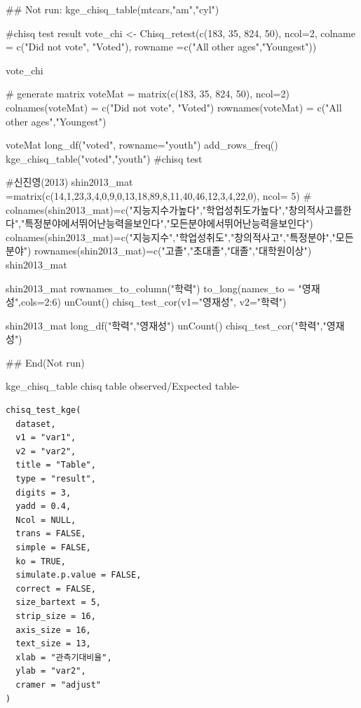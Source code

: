 \documentclass[a4paper]{book}
\begin{document}
\begin{Examples}
\begin{ExampleCode}

## Not run: 
kge_chisq_table(mtcars,"am","cyl")


#chisq test result
vote_chi <- Chisq_retest(c(183, 35, 824, 50), ncol=2,
                        colname = c("Did not vote", "Voted"),
                         rowname =c("All other ages","Youngest"))

vote_chi


# generate matrix
voteMat = matrix(c(183, 35, 824, 50), ncol=2)
colnames(voteMat) = c("Did not vote", "Voted")
rownames(voteMat) = c("All other ages","Youngest")

voteMat%
  long_df("voted", rowname="youth")%
  add_rows_freq() %
  kge_chisq_table("voted","youth")    #chisq test


#신진영(2013)
shin2013_mat =matrix(c(14,1,23,3,4,0,9,0,13,18,89,8,11,40,46,12,3,4,22,0), ncol= 5)
# colnames(shin2013_mat)=c("지능지수가높다","학업성취도가높다","창의적사고를한다","특정분야에서뛰어난능력을보인다","모든분야에서뛰어난능력을보인다")
colnames(shin2013_mat)=c("지능지수","학업성취도","창의적사고","특정분야","모든분야")
rownames(shin2013_mat)=c("고졸","초대졸","대졸","대학원이상")
shin2013_mat

shin2013_mat %
  rownames_to_column("학력") %
  to_long(names_to = "영재성",cols=2:6) %
  unCount() %
  chisq_test_cor(v1="영재성", v2="학력")


shin2013_mat%
  long_df("학력","영재성") %
  unCount() %
  chisq_test_cor("학력","영재성")


## End(Not run)
\end{ExampleCode}
\end{Examples}
%
\begin{Description}
kge\_chisq\_table chisq table observed/Expected table-
\end{Description}
%
\begin{Usage}
\begin{verbatim}
chisq_test_kge(
  dataset,
  v1 = "var1",
  v2 = "var2",
  title = "Table",
  type = "result",
  digits = 3,
  yadd = 0.4,
  Ncol = NULL,
  trans = FALSE,
  simple = FALSE,
  ko = TRUE,
  simulate.p.value = FALSE,
  correct = FALSE,
  size_bartext = 5,
  strip_size = 16,
  axis_size = 16,
  text_size = 13,
  xlab = "관측기대비율",
  ylab = "var2",
  cramer = "adjust"
)
\end{verbatim}
\end{Usage}
\end{document}
